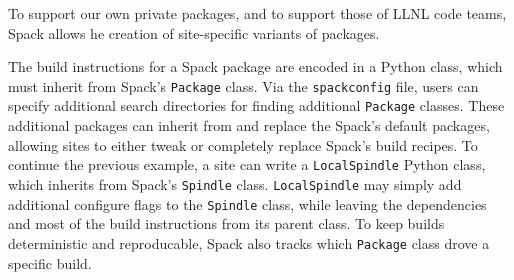 To support our own private packages, and to support those of LLNL code teams, Spack allows he creation of site-specific variants of packages.  

The build instructions for a Spack package are encoded in a Python class, which must inherit from Spack's {\tt Package} class.  Via the {\tt spackconfig} file, users can specify additional search directories for finding additional {\tt Package} classes.  These additional packages can inherit from and replace the Spack's default packages, allowing sites to either tweak or completely replace Spack's build recipes.  To continue the previous example, a site can write a {\tt LocalSpindle} Python class, which inherits from Spack's {\tt Spindle} class.  {\tt LocalSpindle} may simply add additional configure flags to the {\tt Spindle} class, while leaving the dependencies and most of the build instructions from its parent class.  To keep builds deterministic and reproducable, Spack also tracks which {\tt Package} class drove a specific build. 









